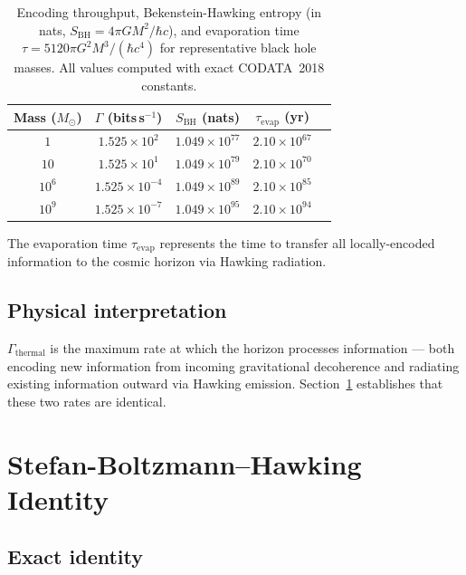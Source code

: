 \documentclass[12pt,a4paper]{article}
\begin{document}
\begin{table}[h]
\centering
\caption{Encoding throughput, Bekenstein-Hawking entropy (in nats,
$S_\mathrm{BH} = 4\pi G M^2/\hbar c$), and evaporation time
$\tau = 5120\pi G^2 M^3/(\hbar c^4)$ for representative black hole masses.
All values computed with exact CODATA~2018 constants.}
\label{tab:throughput}
\begin{tabular}{ccccc}
\toprule
Mass ($M_\odot$) & $\Gamma$ (bits\,s$^{-1}$) & $S_\mathrm{BH}$ (nats) & $\tau_\mathrm{evap}$ (yr) \\
\midrule
$1$       & $1.525 \times 10^{2}$  & $1.049 \times 10^{77}$ & $2.10 \times 10^{67}$ \\
$10$      & $1.525 \times 10^{1}$  & $1.049 \times 10^{79}$ & $2.10 \times 10^{70}$ \\
$10^{6}$  & $1.525 \times 10^{-4}$ & $1.049 \times 10^{89}$ & $2.10 \times 10^{85}$ \\
$10^{9}$  & $1.525 \times 10^{-7}$ & $1.049 \times 10^{95}$ & $2.10 \times 10^{94}$ \\
\bottomrule
\end{tabular}
\end{table}

The evaporation time $\tau_\mathrm{evap}$ represents the time to transfer all
locally-encoded information to the cosmic horizon via Hawking radiation.

\subsection{Physical interpretation}

$\Gamma_\mathrm{thermal}$ is the maximum rate at which the horizon processes
information --- both encoding new information from incoming gravitational
decoherence and radiating existing information outward via Hawking emission.
Section~\ref{sec:sb_identity} establishes that these two rates are identical.

\section{Stefan-Boltzmann--Hawking Identity}
\label{sec:sb_identity}

\subsection{Exact identity}
\end{document}
